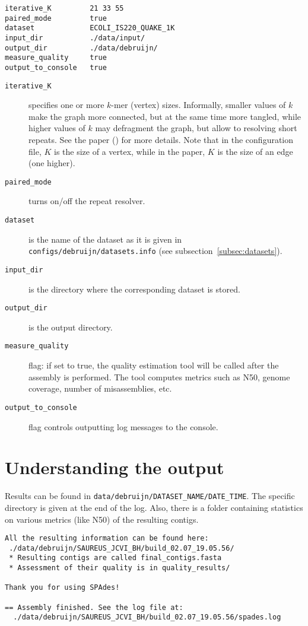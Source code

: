 \documentclass{article}
\begin{document}
\begin{lstlisting}
iterative_K         21 33 55
paired_mode         true 
dataset             ECOLI_IS220_QUAKE_1K
input_dir           ./data/input/
output_dir          ./data/debruijn/
measure_quality     true
output_to_console   true
\end{lstlisting}

\begin{description}
\item[{\tt iterative\_K}] specifies one or more $k$-mer (vertex) sizes.  Informally, smaller values of $k$ make the graph more connected, but at the same time more tangled, while higher values of $k$ may defragment the graph, but allow to resolving short repeats. See the paper (\cite{main}) for more details.  Note that in the configuration file, $K$ 
is the size of a vertex, while in the paper, $K$ is the size of an edge (one higher).
\item[{\tt paired\_mode}] turns on/off the repeat resolver.
\item[{\tt dataset}] is the name of the dataset as it is given in {\tt configs/debruijn/datasets.info} (see subsection~\ref{subsec:datasets}).
\item[{\tt input\_dir}] is the directory where the corresponding dataset is stored.
\item[{\tt output\_dir}] is the output directory.
\item[{\tt measure\_quality}] flag: if set to true, the quality estimation tool will be called after the assembly is performed.  The tool computes metrics such as N50, genome coverage, number of misassemblies, etc.
\item[{\tt output\_to\_console}] flag controls outputting log messages to the console.
\end{description}

\section{Understanding the output}
Results can be found in {\tt data/debruijn/DATASET\_NAME/DATE\_TIME}.
The specific directory is given at the end of the log.
Also, there is a folder containing statistics on various metrics (like N50) of the resulting contigs.
\begin{lstlisting}
All the resulting information can be found here: 
 ./data/debruijn/SAUREUS_JCVI_BH/build_02.07_19.05.56/
 * Resulting contigs are called final_contigs.fasta
 * Assessment of their quality is in quality_results/

Thank you for using SPAdes!

== Assembly finished. See the log file at: 
  ./data/debruijn/SAUREUS_JCVI_BH/build_02.07_19.05.56/spades.log
\end{lstlisting}
\end{document}
